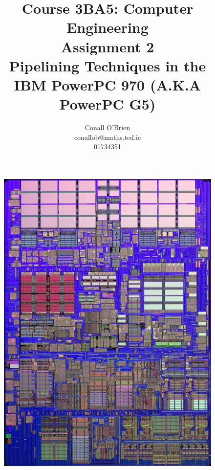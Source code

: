 \documentclass[a4paper,12pt]{article}
\begin{document}


\title{Course 3BA5: Computer Engineering \\ Assignment 2 \\ Pipelining
Techniques in the \\ IBM PowerPC 970 (A.K.A PowerPC G5)}

\author{Conall O'Brien \\ conallob@maths.tcd.ie \\ 01734351}

\maketitle

\begin{figure}[hb]

\begin{center}

\includegraphics{powerpc970-1.png}

\end{center}

\caption{\cite[The IBM PowerPC 970 Microprocessor Unit]{a10}}

\end{figure}
\end{document}
